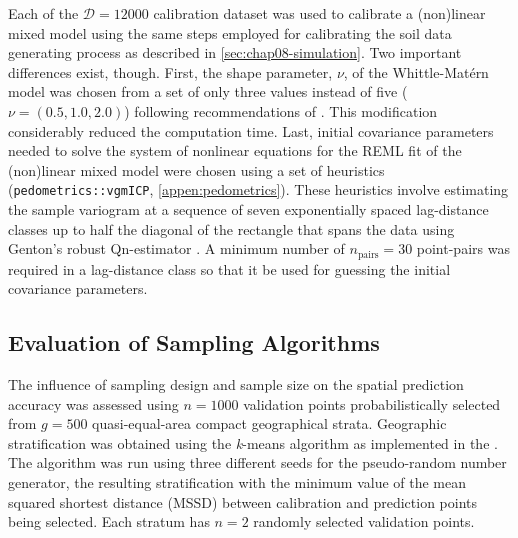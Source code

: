 Each of the $\mathcal{D} = \num{12000}$ calibration dataset was used to calibrate a (non)linear mixed model 
using the same steps employed for calibrating the soil data generating process as described in 
\autoref{sec:chap08-simulation}. Two important differences exist, though. First, the shape parameter, $\nu$, 
of the Whittle-Matérn model was chosen from a set of only three values instead of five ($\nu = (0.5, 1.0, 
2.0)$) following recommendations of \citet{MoyeedEtAl2002}. This modification considerably reduced the 
computation time. Last, initial covariance parameters needed to solve the system of nonlinear equations for 
the REML fit of the (non)linear mixed model \cite{KuenschEtAl2011} were chosen using a set of heuristics 
(\texttt{pedometrics::vgmICP}, \autoref{appen:pedometrics}). These heuristics involve estimating the sample
variogram at a sequence of seven exponentially spaced lag-distance classes up to half the diagonal of the 
rectangle that spans the data using Genton's robust Qn-estimator \cite{Genton1998}. A minimum number of 
$n_\text{pairs} = 30$ point-pairs was required in a lag-distance class so that it be used for guessing the 
initial covariance parameters.

\subsection{Evaluation of Sampling Algorithms}

The influence of sampling design and sample size on the spatial prediction accuracy was assessed using $n = 
1000$ validation points probabilistically selected from $g = 500$ quasi-equal-area compact geographical strata. 
Geographic stratification was obtained using the \textit{k}-means algorithm as implemented in the 
 \cite{WalvoortEtAl2010}. The algorithm was run using three different seeds for the 
pseudo-random number generator, the resulting stratification with the minimum value of the mean squared 
shortest distance (MSSD) between calibration and prediction points being selected. Each stratum has $n = 2$ 
randomly selected validation points.

